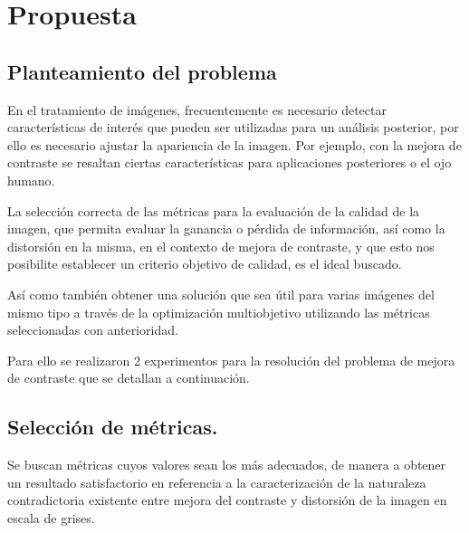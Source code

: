 \chapter{Propuesta}
\label{chap5}
\ifpdf
  \graphicspath{{Chapter5/Chapter5Figs/PNG/}{Chapter5/Chapter5Figs/PDF/}{Chapter5/Chapter5Figs/}}
\else
  \graphicspath{{Chapter5/Chapter5Figs/EPS/}{Chapter5/Chapter5Figs/}}
\fi


\section{Planteamiento del problema}
\label{sec:planteamiento}

En el tratamiento de imágenes, frecuentemente es necesario detectar características de interés que pueden ser utilizadas para un análisis posterior, por ello es necesario ajustar la apariencia de la imagen. Por ejemplo, con la mejora de contraste se resaltan ciertas características para aplicaciones posteriores o el ojo humano.

La selección correcta de las métricas para la evaluación de la calidad de la imagen, que permita evaluar la ganancia o pérdida de información, así como la distorsión en la misma, en el contexto de mejora de contraste, y que esto nos posibilite establecer un criterio objetivo de calidad, es el ideal buscado.

Así como también obtener una solución que sea útil para varias imágenes del mismo tipo a través de la optimización multiobjetivo utilizando las métricas seleccionadas con anterioridad.

Para ello se realizaron 2 experimentos para la resolución del problema de mejora de contraste que se detallan a continuación.



\section{Selección de métricas.}
\label{sec:sele_metricas}

Se buscan métricas cuyos valores sean los más adecuados, de manera a obtener un resultado satisfactorio en referencia a la caracterización de la naturaleza contradictoria existente entre mejora del contraste y distorsión de la imagen en escala de grises.

